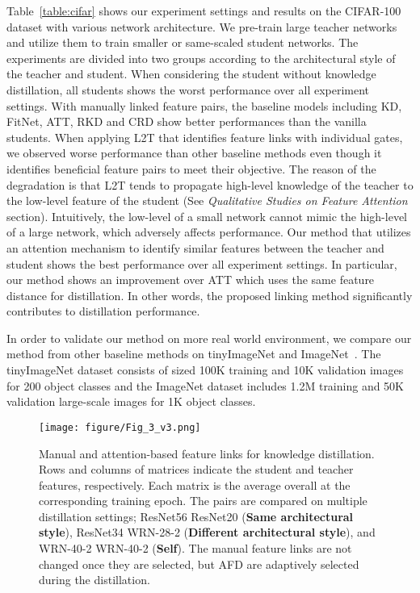 Table~\ref{table:cifar} shows our experiment settings and results on the CIFAR-100 dataset with various network architecture. We pre-train large teacher networks and utilize them to train smaller or same-scaled student networks. The experiments are divided into two groups according to the architectural style of the teacher and student. When considering the student without knowledge distillation, all students shows the worst performance over all experiment settings. With manually linked feature pairs, the baseline models including KD, FitNet, ATT, RKD and CRD show better performances than the vanilla students. 
When applying L2T that identifies feature links with individual gates, we observed worse performance than other baseline methods even though it identifies beneficial feature pairs to meet their objective. 
The reason of the degradation is that L2T tends to propagate high-level knowledge of the teacher to the low-level feature of the student (See \textit{Qualitative Studies on Feature Attention} section).
Intuitively, the low-level of a small network cannot mimic the high-level of a large network, which adversely affects performance.
Our method that utilizes an attention mechanism to identify similar features between the teacher and student shows the best performance over all experiment settings.
In particular, our method shows an improvement over ATT which uses the same feature distance for distillation. In other words, the proposed linking method significantly contributes to distillation performance.

In order to validate our method on more real world environment, we compare our method from other baseline methods on tinyImageNet and ImageNet~\cite{imagenet}. The tinyImageNet dataset consists of  sized 100K training and 10K validation images for 200 object classes and the ImageNet dataset includes 1.2M training and 50K validation large-scale images for 1K object classes. 
\begin{figure*}[t]
    \centering
    \texttt{[image: figure/Fig\_3\_v3.png]}
    \caption{
    Manual and attention-based feature links for knowledge distillation. Rows and columns of matrices indicate the student and teacher features, respectively. Each matrix is the average overall  at the corresponding training epoch. The pairs are compared on multiple distillation settings; ResNet56  ResNet20 (\textbf{Same architectural style}), ResNet34  WRN-28-2 (\textbf{Different architectural style}), and WRN-40-2  WRN-40-2 (\textbf{Self}). The manual feature links are not changed once they are selected, but AFD are adaptively selected during the distillation.}
    \label{fig:attention_epoch}
\end{figure*}

